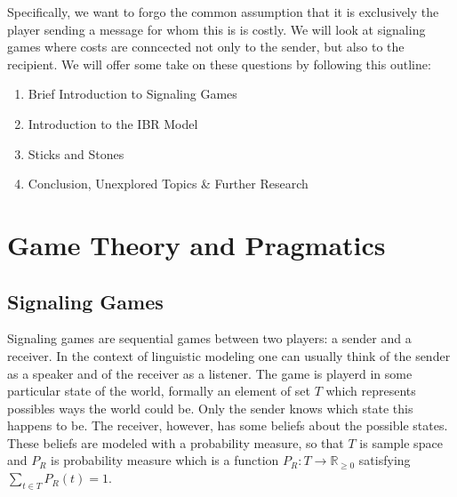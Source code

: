 \documentclass[10]{article}
\begin{document}
Specifically, we want to forgo the common assumption that it is exclusively the player sending a message for whom this is is costly. We will look at signaling games where costs are conncected not only to the sender, but also to the recipient.
We will offer some take on these questions by following this outline:
\begin{enumerate} %
\item Brief Introduction to Signaling Games
\item Introduction to the IBR Model
\item Sticks and Stones
\item Conclusion, Unexplored Topics \& Further Research
\end{enumerate}

\section{Game Theory and Pragmatics}
\subsection{Signaling Games}
Signaling games are sequential games between two players: a sender and a receiver. In the context of linguistic modeling one can usually think of the sender as a speaker and of the receiver as a listener. The game is playerd in some particular state of the world, formally an element of set $T$ which represents possibles ways the world could be. Only the sender knows which state this happens to be. The receiver, however, has some beliefs about the possible states. These beliefs are modeled with a probability measure, so that $T$ is sample space and $P_R$ is probability measure which is a function $P_R: T\rightarrow \mathbb{R}_{\geq 0}$ satisfying $\sum_{t\in T}P_R(t)=1$.
\end{document}
